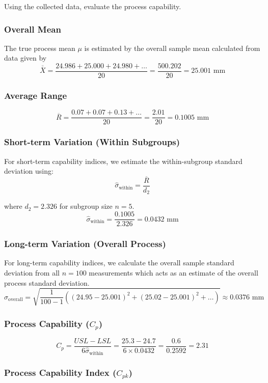 \documentclass[twoside]{book}
\begin{document}
Using the collected data, evaluate the process capability.


\subsubsection{Overall Mean}
The true process mean $\mu$ is estimated by the overall sample mean calculated from data given by
\[
\overline{\overline{X}} = \dfrac{24.986 + 25.000 + 24.980 + \dots}{20} = \dfrac{500.202}{20} = 25.001 \text{ mm}
\]

\subsubsection{Average Range}
\[
\overline{R} = \dfrac{0.07 + 0.07 + 0.13 + \dots}{20} = \dfrac{2.01}{20} = 0.1005 \text{ mm}
\]

\subsubsection{Short-term Variation (Within Subgroups)}

For short-term capability indices, we estimate the within-subgroup standard deviation using:
\[
\hat{\sigma}_{\text{within}} = \dfrac{\overline{R}}{d_2}
\]

where \(d_2 = 2.326\) for subgroup size \(n = 5\).
\[
\hat{\sigma}_{\text{within}} = \dfrac{0.1005}{2.326} = 0.0432 \text{ mm}
\]

\subsubsection{Long-term Variation (Overall Process)}

For long-term capability indices, we calculate the overall sample standard deviation from all \(n = 100\) measurements which acts as an estimate of the overall process standard deviation.
\[
\hat{\sigma}_{\text{overall}} = \sqrt{\dfrac{1}{100-1}\left((24.95-25.001)^2 + (25.02-25.001)^2+ \dots \right)} \approx 0.0376 \text{ mm}
\]

\subsubsection{Process Capability (\texorpdfstring{$C_p$}{Cp})}

\[
C_p = \dfrac{USL - LSL}{6\hat{\sigma}_{\text{within}}} = \dfrac{25.3 - 24.7}{6 \times 0.0432} = \dfrac{0.6}{0.2592} = 2.31
\]

\subsubsection{Process Capability Index (\texorpdfstring{$C_{pk}$}{Cpk})}
\end{document}
